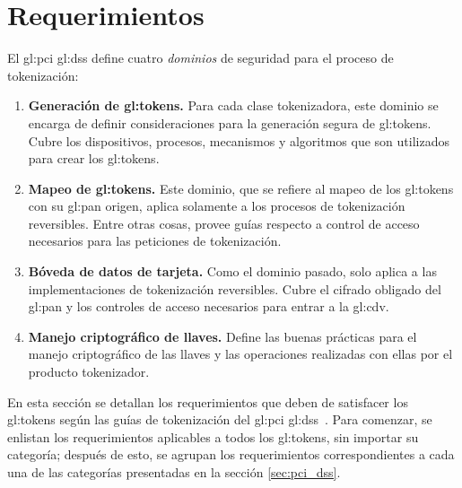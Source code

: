 %
%

\section{Requerimientos}
\label{sec:requerimientos}

El \gls{gl:pci} \gls{gl:dss} define cuatro \textit{dominios} de seguridad para
el proceso de tokenización:

\begin{enumerate}

  \item \label{dm:gen_tokens} \textbf{Generación de \glspl{gl:token}.}
    Para cada clase tokenizadora, este dominio se encarga de definir
    consideraciones para la generación segura de \glspl{gl:token}. Cubre los
    dispositivos, procesos, mecanismos y algoritmos que son utilizados para
    crear los \glspl{gl:token}.

  \item \label{dm:mapeo_tokens} \textbf{Mapeo de \glspl{gl:token}.}
    Este dominio, que se refiere al mapeo de los \glspl{gl:token} con su
    \gls{gl:pan} origen, aplica solamente a los procesos de tokenización
    reversibles. Entre otras cosas, provee guías respecto a control de acceso
    necesarios para las peticiones de tokenización.

  \item \label{dm:card_data} \textbf{Bóveda de datos de tarjeta.}
    Como el dominio pasado, solo aplica a las implementaciones de tokenización
    reversibles. Cubre el cifrado obligado del \gls{gl:pan} y los controles de
    acceso necesarios para entrar a la \gls{gl:cdv}.

  \item \label{dm:man_llaves} \textbf{Manejo criptográfico de llaves.}
    Define las buenas prácticas para el manejo criptográfico de las llaves y
    las operaciones realizadas con ellas por el producto tokenizador.

\end{enumerate}

En esta sección se detallan los requerimientos que deben de satisfacer los
\glspl{gl:token} según las guías de tokenización del \gls{gl:pci}
\gls{gl:dss}~\cite{pci_tokens}. Para comenzar, se enlistan los requerimientos
aplicables a todos los \glspl{gl:token}, sin importar su categoría; después de
esto, se agrupan los requerimientos correspondientes a cada una de las
categorías presentadas en la sección \ref{sec:pci_dss}.

